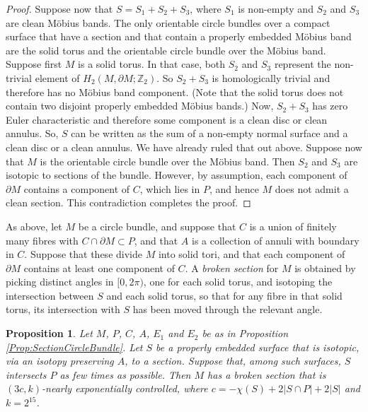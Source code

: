 \documentclass[oneside]{amsart}
\numberwithin{equation}{section}
\theoremstyle{plain}
\newtheorem{proposition}[equation]{Proposition}
\theoremstyle{definition}
\begin{document}
\begin{proof}
Suppose now that $S = S_1 + S_2 +S_3$, where $S_1$ is non-empty and $S_2$ and $S_3$
are clean M\"obius bands. The only orientable circle bundles over a compact surface that have a section and that contain a properly embedded
M\"obius band are the solid torus and the orientable circle bundle over the M\"obius band. Suppose first $M$ is
a solid torus. In that case, both $S_2$ and $S_3$ represent the non-trivial
element of $H_2(M, \partial M; \mathbb{Z}_2)$. So $S_2 + S_3$ is homologically trivial and 
therefore has no M\"obius band component. (Note that the solid torus does not contain
two disjoint properly embedded M\"obius bands.) Now, $S_2 + S_3$ has zero Euler characteristic
and therefore some component is a clean disc or clean annulus. So, $S$ can be written as
the sum of a non-empty normal surface and a clean disc or a clean annulus. We have already
ruled that out above. Suppose now that $M$ is the orientable circle bundle over the M\"obius band.
Then $S_2$ and $S_3$ are isotopic to sections of the bundle. However, by assumption, each
component of $\partial M$ contains a component of $C$, which lies in $P$, and hence
$M$ does not admit a clean section. This contradiction completes the proof.
\end{proof}


As above, let $M$ be a circle bundle, and suppose that $C$ is a union of finitely many fibres with $C \cap \partial M \subset P$,
and that $A$ is a collection of annuli with boundary in $C$. Suppose that these divide $M$ into
solid tori, and that each component of $\partial M$ contains at least one component of $C$.
A \emph{broken section} for $M$ is obtained by picking distinct angles in $[0, 2\pi)$, one
for each solid torus, and isotoping the intersection between $S$ and each solid torus, so that for
any fibre in that solid torus, its intersection with $S$ has been moved through the relevant angle.

\begin{proposition}
\label{Prop:PerturbSection}
Let $M$, $P$, $C$, $A$, $E_1$ and $E_2$ be as in Proposition \ref{Prop:SectionCircleBundle}.
Let $S$ be a properly embedded surface that is isotopic, via an isotopy preserving $A$, to a section.
Suppose that, among such surfaces, $S$ intersects $P$ as few times as possible.
Then $M$ has a broken section that is $(3c,k)$-nearly exponentially controlled, where $c = -\chi(S) + 2 |S \cap P| + 2|S|$ and $k = 2^{15}$.
\end{proposition}
\end{document}
